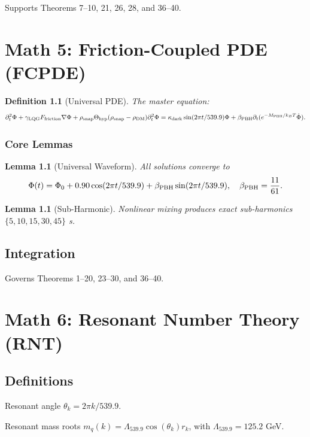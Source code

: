 \documentclass[11pt,a4paper]{book}
\newtheorem{lemma}[theorem]{Lemma}
\newtheorem{definition}[theorem]{Definition}
\theoremstyle{remark}
\theoremstyle{definition}
\begin{document}
Supports Theorems 7–10, 21, 26, 28, and 36–40.

\chapter{Math 5: Friction-Coupled PDE (FCPDE)}

\begin{definition}[Universal PDE]
The master equation:
\[ \partial_t^2 \Phi + \gamma_{\rm LQG} F_{\rm friction} \nabla \Phi + \rho_{\rm snap} \Theta_{\rm hyp}(\rho_{\rm snap} - \rho_{\rm DM}) \partial_t^2 \Phi = \kappa_{\rm dark} \sin(2\pi t / 539.9) \Phi + \beta_{\rm PBH} \partial_t (e^{-M_{\rm PBH}/k_B T} \dot{\Phi}). \]
\end{definition}

\subsection{Core Lemmas}

\begin{lemma}[Universal Waveform]
All solutions converge to
\[ \Phi(t) = \Phi_0 + 0.90 \cos(2\pi t / 539.9) + \beta_{\rm PBH}\sin(2\pi t / 539.9),
\quad \beta_{\rm PBH}=\frac{11}{61}. \]
\end{lemma}

\begin{lemma}[Sub-Harmonic]
Nonlinear mixing produces exact sub-harmonics \(\{5,10,15,30,45\}\) s.
\end{lemma}

\section{Integration}

Governs Theorems 1–20, 23–30, and 36–40.

\chapter{Math 6: Resonant Number Theory (RNT)}

\section{Definitions}

Resonant angle \(\theta_k = 2\pi k / 539.9\).

Resonant mass roots \(m_q(k) = \Lambda_{539.9} \cos(\theta_k) r_k\), with \(\Lambda_{539.9} = 125.2\) GeV.
\end{document}
